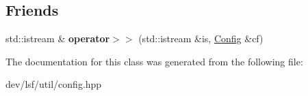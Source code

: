\subsection*{Friends}
\begin{DoxyCompactItemize}
\item 
\hypertarget{classlsf_1_1util_1_1Config_aadcf9efa9375b7d87e0c6beb58456cfe}{
std::istream \& {\bfseries operator$>$$>$} (std::istream \&is, \hyperlink{classlsf_1_1util_1_1Config}{Config} \&cf)}
\label{classlsf_1_1util_1_1Config_aadcf9efa9375b7d87e0c6beb58456cfe}

\end{DoxyCompactItemize}


The documentation for this class was generated from the following file:\begin{DoxyCompactItemize}
\item 
dev/lsf/util/config.hpp\end{DoxyCompactItemize}
